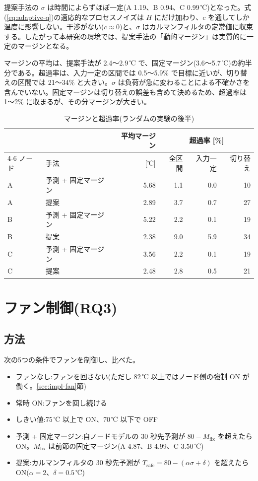 提案手法の $\sigma$ は時間によらずほぼ一定(A 1.19、B 0.94、C 0.99\,℃)となった。式(\ref{eq:adaptive-q})の適応的なプロセスノイズは $H$ にだけ加わり、$c$ を通してしか温度に影響しない。干渉がない($c \approx 0$)と、$\sigma$ はカルマンフィルタの定常値に収束する。したがって本研究の環境では、提案手法の「動的マージン」は実質的に一定のマージンとなる。

マージンの平均は、提案手法が 2.4〜2.9\,℃ で、固定マージン(3.6〜5.7\,℃)の約半分である。超過率は、入力一定の区間では 0.5〜5.9\% で目標に近いが、切り替えの区間では 21〜34\% と大きい。$\sigma$ は負荷が急に変わることによる不確かさを含んでいない。固定マージンは切り替えの誤差も含めて決めるため、超過率は 1〜2\% に収まるが、その分マージンが大きい。

\begin{table}[tb]
  \centering
  \caption{マージンと超過率(ランダムの実験の後半)}
  \label{tab:eval-margin}
  \begin{tabular}{llrrrr}
    \toprule
    & & 平均マージン & \multicolumn{3}{c}{超過率 [\%]} \\
    \cmidrule(lr){4-6}
    ノード & 手法 & [℃] & 全区間 & 入力一定 & 切り替え \\
    \midrule
    A & 予測 + 固定マージン & 5.68 & 1.1 & 0.0 & 10 \\
    A & 提案 & 2.89 & 3.7 & 0.7 & 27 \\
    B & 予測 + 固定マージン & 5.22 & 2.2 & 0.1 & 19 \\
    B & 提案 & 2.38 & 9.0 & 5.9 & 34 \\
    C & 予測 + 固定マージン & 3.56 & 2.2 & 0.1 & 19 \\
    C & 提案 & 2.48 & 2.8 & 0.5 & 21 \\
    \bottomrule
  \end{tabular}
\end{table}

\section{ファン制御(RQ3)}\label{sec:eval-control}
\subsection{方法}
次の5つの条件でファンを制御し、比べた。

\begin{itemize}
  \item ファンなし:ファンを回さない(ただし 82\,℃ 以上ではノード側の強制 ON が働く。\ref{sec:impl-fan}節)
  \item 常時 ON:ファンを回し続ける
  \item しきい値:75\,℃ 以上で ON、70\,℃ 以下で OFF
  \item 予測 + 固定マージン:自ノードモデルの 30 秒先予測が $80 - M_{\mathrm{fix}}$ を超えたら ON。$M_{\mathrm{fix}}$ は前節の固定マージン(A 4.87、B 4.99、C 3.50\,℃)
  \item 提案:カルマンフィルタの 30 秒先予測が $T_{\mathrm{safe}} = 80 - (\alpha\sigma + \delta)$ を超えたら ON($\alpha = 2$、$\delta = 0.5$\,℃)
\end{itemize}

